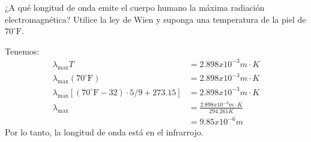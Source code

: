     
    \begin{problema}
        ¿A qué longitud de onda emite el cuerpo humano la máxima radiación electromagnética? Utilice la ley de Wien y suponga una temperatura de la piel de $70^{\circ} \mathrm{F}$.
        \begin{sol}
            Tenemos:
            \begin{align*}
                \lambda_ {\max} T & = 2.898x10^{-3}m\cdot K \\
                \lambda_{\max} (70^{\circ} \mathrm{F})&= 2.898x10^{-3}m\cdot K \\
                \lambda_{\max} [(70^{\circ} \mathrm{F}-32)\cdot 5/9 + 273.15]&= 2.898x10^{-3}m\cdot K \\
                \lambda_{\max} &= \frac{2.898x10^{-3}m\cdot K }{294.261K}\\
                &= 9.85x10^{-6}m
            \end{align*}
            Por lo tanto, la longitud de onda está en el infrarrojo. 
        \end{sol}
    \end{problema}
    
